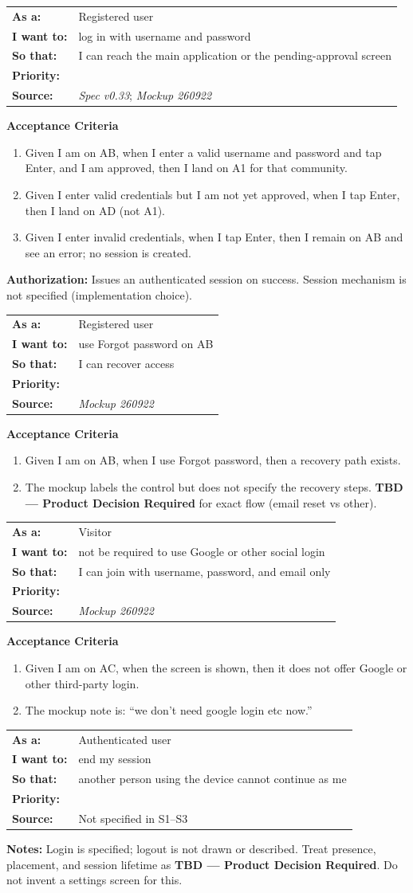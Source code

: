 \documentclass[11pt,a4paper]{article}
\makeatletter
\newcommand{\priPzero}{\colorbox{p0}{\makebox[4.6em]{\textcolor{white}{\scriptsize\bfseries P0 V1}}}}
\newcommand{\priPone}{\colorbox{p1}{\makebox[4.6em]{\textcolor{white}{\scriptsize\bfseries P1}}}}
\newcommand{\priTBD}{\colorbox{tbd}{\makebox[4.6em]{\textcolor{white}{\scriptsize\bfseries TBD}}}}
\newcommand{\srcSpec}{\textit{Spec v0.33}}
\newcommand{\srcMock}{\textit{Mockup 260922}}
\newenvironment{story}[1]{%
  \Needspace{10\baselineskip}%
  \vspace{0.7em}%
  \noindent
  \colorbox{navy}{\makebox[\dimexpr\textwidth-2\fboxsep\relax][l]{\textcolor{white}{\bfseries\ #1}}}%
  \par\vspace{0.35em}%
}{\par\vspace{0.55em}}
\newcommand{\storymeta}[5]{%
  \noindent
  \begin{tabularx}{\textwidth}{@{}>{\bfseries}l X@{}}
    As a: & #1 \\
    I want to: & #2 \\
    So that: & #3 \\
    Priority: & #4 \\
    Source: & #5 \\
  \end{tabularx}
  \par\vspace{0.3em}
}
\newcommand{\achead}{\noindent\textbf{Acceptance Criteria}\par}
\newcommand{\authz}[1]{\noindent\textbf{Authorization:} #1\par}
\newcommand{\notes}[1]{\noindent\textbf{Notes:} #1\par}
\makeatother
\begin{document}
\begin{story}{AUTH-003 --- Log in}
\storymeta{Registered user}{log in with username and password}{I can reach the main application or the pending-approval screen}{\priPzero}{\srcSpec; \srcMock}
\achead
\begin{enumerate}
  \item Given I am on AB, when I enter a valid username and password and tap Enter, and I am approved, then I land on A1 for that community.
  \item Given I enter valid credentials but I am not yet approved, when I tap Enter, then I land on AD (not A1).
  \item Given I enter invalid credentials, when I tap Enter, then I remain on AB and see an error; no session is created.
\end{enumerate}
\authz{Issues an authenticated session on success. Session mechanism is not specified (implementation choice).}
\end{story}

\begin{story}{AUTH-004 --- Forgot password}
\storymeta{Registered user}{use Forgot password on AB}{I can recover access}{\priPone}{\srcMock}
\achead
\begin{enumerate}
  \item Given I am on AB, when I use Forgot password, then a recovery path exists.
  \item The mockup labels the control but does not specify the recovery steps. \textbf{TBD --- Product Decision Required} for exact flow (email reset vs other).
\end{enumerate}
\end{story}

\begin{story}{AUTH-005 --- No Google or social login in V1}
\storymeta{Visitor}{not be required to use Google or other social login}{I can join with username, password, and email only}{\priPzero}{\srcMock}
\achead
\begin{enumerate}
  \item Given I am on AC, when the screen is shown, then it does not offer Google or other third-party login.
  \item The mockup note is: ``we don't need google login etc now.''
\end{enumerate}
\end{story}

\begin{story}{AUTH-006 --- Log out / session end}
\storymeta{Authenticated user}{end my session}{another person using the device cannot continue as me}{\priTBD}{Not specified in S1--S3}
\notes{Login is specified; logout is not drawn or described. Treat presence, placement, and session lifetime as \textbf{TBD --- Product Decision Required}. Do not invent a settings screen for this.}
\end{story}
\end{document}
